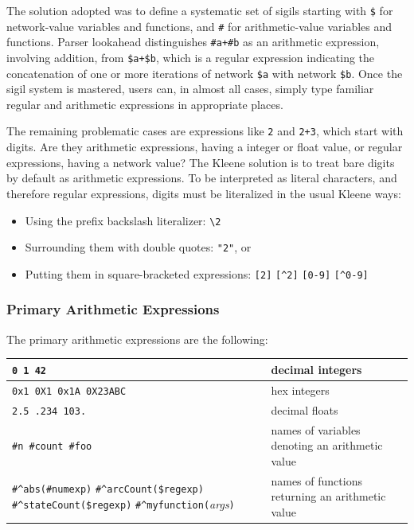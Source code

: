 \documentclass[letterpaper,12pt]{article}
\newcommand{\Kleene}{Kleene\xspace}
\begin{document}
The solution adopted was to define a systematic set of sigils starting
with \verb!$! for network-value variables and functions, and \verb!#! for
arithmetic-value variables and functions.  Parser lookahead distinguishes
\verb!#a+#b! as an arithmetic expression, involving addition, from
\verb!$a+$b!, which is a regular expression indicating the concatenation
of one or more iterations of network \verb!$a! with network \verb!$b!.
Once the sigil system is mastered, users can, in almost all cases, simply
type familiar regular and arithmetic expressions in appropriate places. 

The remaining problematic cases are expressions like \verb!2! and
\verb!2+3!, which start with digits.  Are they arithmetic expressions,
having a integer or float value, or regular expressions, having a network
value?  The \Kleene{} solution is to treat bare digits by default as
arithmetic expressions.  To be interpreted as literal characters, and
therefore regular expressions, digits must be literalized in the usual
\Kleene{} ways:

\begin{itemize}
\item
Using the prefix backslash literalizer:  \verb!\2!
\item
Surrounding them with double quotes: \verb!"2"!, or
\item
Putting them in square-bracketed expressions: \verb![2]! \verb![^2]! \verb![0-9]! \verb![^0-9]!
\end{itemize}

\subsubsection{Primary Arithmetic Expressions}

The primary arithmetic expressions are the following:

\vspace{.5cm}

\renewcommand\tabcolsep{1.25mm}

\noindent
\begin{tabular}{|p{5.5cm}|l|}
\hline
\verb!0 1 42!  & decimal integers\\
\hline
\verb!0x1 0X1 0x1A 0X23ABC! & hex integers\\
\hline
\verb!2.5 .234 103.! & decimal floats\\
\hline
\verb!#n #count #foo! & names of variables denoting an arithmetic value\\
\hline
\verb!#^abs(#numexp)! \verb!#^arcCount($regexp)!
\verb!#^stateCount($regexp)! \verb!#^myfunction(!\emph{args}\verb!)! & names of functions returning an arithmetic value\\
\hline
\end{tabular}
\end{document}
